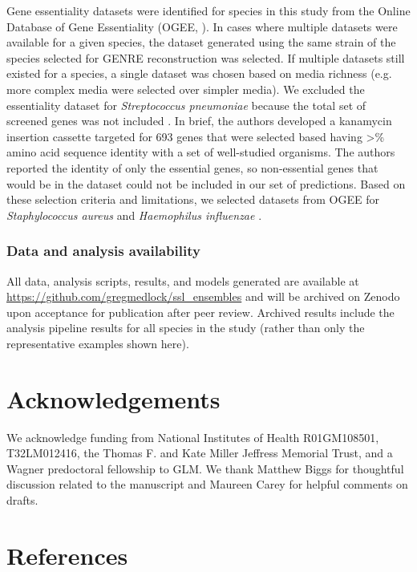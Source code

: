 \documentclass[11pt,twocolumn,notitlepage,openany,twoside]{book}
\begin{document}
\begin{refsection}
Gene essentiality datasets were identified for species in this study from the Online Database of Gene Essentiality (OGEE, \cite{Chen2017-cs}). In cases where multiple datasets were available for a given species, the dataset generated using the same strain of the species selected for GENRE reconstruction was selected. If multiple datasets still existed for a species, a single dataset was chosen based on media richness (e.g. more complex media were selected over simpler media). We excluded the essentiality dataset for \textit{Streptococcus pneumoniae} because the total set of screened genes was not included \cite{Song2005-uc}. In brief, the authors developed a kanamycin insertion cassette targeted for 693 genes that were selected based having \textgreater{}\% amino acid sequence identity with a set of well-studied organisms. The authors reported the identity of only the essential genes, so non-essential genes that would be in the dataset could not be included in our set of predictions. Based on these selection criteria and limitations, we selected datasets from OGEE for \textit{Staphylococcus aureus} \cite{Chaudhuri2009-za} and \textit{Haemophilus influenzae} \cite{Akerley2002-ja}.

\subsubsection{Data and analysis availability}

All data, analysis scripts, results, and models generated are available at \url{https://github.com/gregmedlock/ssl_ensembles} and will be archived on Zenodo upon acceptance for publication after peer review. Archived results include the analysis pipeline results for all species in the study (rather than only the representative examples shown here).

\section{Acknowledgements}

We acknowledge funding from National Institutes of Health R01GM108501, T32LM012416, the Thomas F. and Kate Miller Jeffress Memorial Trust, and a Wagner predoctoral fellowship to GLM. We thank Matthew Biggs for thoughtful discussion related to the manuscript and Maureen Carey for helpful comments on drafts.

\section{References}


\end{refsection}
\end{document}
